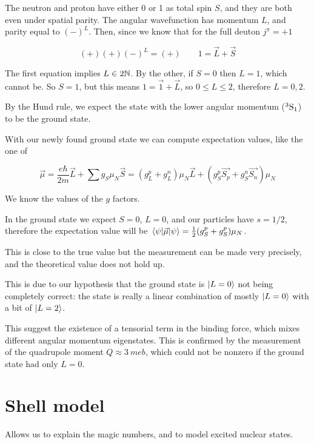 \documentclass{article}
\begin{document}
The neutron and proton have either 0 or 1 as total spin \(S\), and they are both even under spatial parity.
The angular wavefunction has momentum \(L\), and parity equal to \((-)^L\). Then, since we know that for the full deuton \(j^\pi = +1\)

\begin{equation}
    (+)(+)(-)^L = (+) \qquad 1 = \vec{L} + \vec{S}
\end{equation}

The first equation implies \(L \in 2 \mathbb{N}\). By the other, if \(S=0\) then \(L=1\), which cannot be. So \(S=1\), but this means \(1 = \vec{1} + \vec{L}\), so \(0 \leq L \leq 2\), therefore \(L = 0, 2\).

By the Hund rule, we expect the state with the lower angular momentum (\(^{3} \ce{S}_1 \)) to be the ground state.

With our newly found ground state we can compute expectation values, like the one of

\begin{equation}
    \vec{\mu}  = \frac{e \hbar}{2m} \vec{L} + \sum g_S \mu_N \vec{S}
    = (g_L^p + g_L^n) \mu_N \vec{L} + (g_S^p \vec{S_p} + g_S^n \vec{S_n})  \mu_N
\end{equation}

We know the values of the \(g\) factors.

In the ground state we expect \(S = 0\), \(L=0\), and our particles have \(s = 1/2\), therefore the expectation value will be \(\ev{\vec{\mu}}{\psi} = \frac{1}{2} (g_S^p + g_S^p) \mu_N\).

This is close to the true value but the measurement can be made very precisely, and the theoretical value does not hold up.

This is due to our hypothesis that the ground state is \(\ket{L=0} \) not being completely correct: the state is really a linear combination of mostly \(\ket{L=0} \) with a bit of \(\ket{L=2} \).

This suggest the existence of a tensorial term in the binding force, which mixes different angular momentum eigenstates. This is confirmed by the measurement of the quadrupole moment \(Q \approx \SI{3}{meb} \),  which could not be nonzero if the ground state had only \(L=0\).

\section{Shell model}

Allows us to explain the magic numbers, and to model excited nuclear states.
\end{document}
